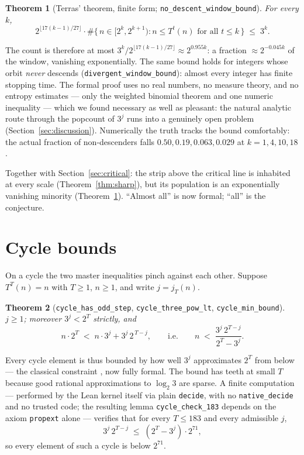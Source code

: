 \documentclass[11pt]{article}
\newtheorem{theorem}{Theorem}[section]
\newcommand{\code}[1]{\texttt{#1}}
\newcommand{\jodd}[2]{j_{#1}(#2)}
\begin{document}
\begin{theorem}[Terras' theorem, finite form;
\code{no\_descent\_window\_bound}]\label{thm:terras}
For every $k$,
\[
2^{\lfloor 17(k-1)/27 \rfloor} \cdot
\#\bigl\{\, n \in [2^k, 2^{k+1}) : n \le T^t(n) \text{ for all } t \le k
\,\bigr\} \;\le\; 3^k .
\]
\end{theorem}

The count is therefore at most $3^k/2^{\lfloor 17(k-1)/27\rfloor}
\approx 2^{0.955k}$: a fraction $\approx 2^{-0.045 k}$ of the window,
vanishing exponentially. The same bound holds for integers whose orbit
\emph{never} descends (\code{divergent\_window\_bound}): almost every
integer has finite stopping time. The formal proof uses no real
numbers, no measure theory, and no entropy estimates --- only the
weighted binomial theorem and one numeric inequality --- which we
found necessary as well as pleasant: the natural analytic route
through the popcount of $3^j$ runs into a genuinely open problem
(Section~\ref{sec:discussion}). Numerically the truth tracks the bound
comfortably: the actual fraction of non-descenders falls $0.50, 0.19,
0.063, 0.029$ at $k = 1, 4, 10, 18$.

Together with Section~\ref{sec:critical}: the strip above the critical
line is inhabited at every scale (Theorem~\ref{thm:sharp}), but its
population is an exponentially vanishing minority
(Theorem~\ref{thm:terras}). ``Almost all'' is now formal; ``all'' is
the conjecture.

\section{Cycle bounds}\label{sec:cycles}

On a cycle the two master inequalities pinch against each other.
Suppose $T^T(n) = n$ with $T \ge 1$, $n \ge 1$, and write
$j = \jodd{T}{n}$.

\begin{theorem}[\code{cycle\_has\_odd\_step},
\code{cycle\_three\_pow\_lt}, \code{cycle\_min\_bound}]
\label{thm:cycles}
$j \ge 1$; moreover $3^j < 2^T$ strictly, and
\[
n \cdot 2^T \;<\; n \cdot 3^j + 3^j\, 2^{\,T-j},
\qquad\text{i.e.}\qquad
n \;<\; \frac{3^j\, 2^{T-j}}{2^T - 3^j}.
\]
\end{theorem}

Every cycle element is thus bounded by how well $3^j$ approximates
$2^T$ from below --- the classical constraint
\cite{eliahou, simons-deweger}, now fully formal. The bound has teeth
at small $T$ because good rational approximations to $\log_2 3$ are
sparse. A finite computation --- performed by the Lean kernel itself
via plain \code{decide}, with no \code{native\_decide} and no trusted
code; the resulting lemma \code{cycle\_check\_183} depends on the
axiom \code{propext} alone --- verifies that for every $T \le 183$ and
every admissible $j$,
\[
3^j\, 2^{T-j} \;\le\; (2^T - 3^j)\cdot 2^{71},
\]
so every element of such a cycle is below $2^{71}$.
\end{document}
